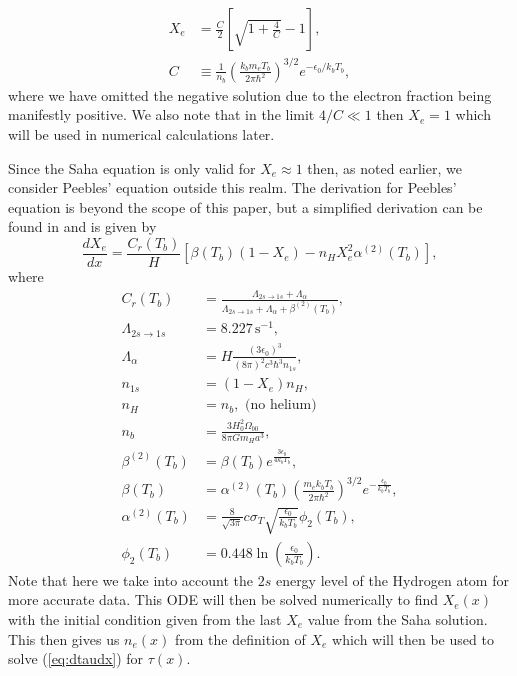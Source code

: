 \documentclass[%
reprint,
 amsmath,amssymb,
 aps,
]{revtex4-2}
\begin{document}
\begin{align}
	X_e&=\frac{C}{2}\left[\sqrt{1+\frac{4}{C}}-1 \right],\label{eq:Saha}\\ 
	C&\equiv\frac{1}{n_b}\left(\frac{k_bm_eT_b}{2\pi\hbar^2}\right)^{3/2}e^{-\epsilon_0/k_bT_b},\label{eq:C}
\end{align}
where we have omitted the negative solution due to the electron fraction being manifestly positive. We also note that in the limit $4/C\ll1$ then $X_e=1$ which will be used in numerical calculations later.

Since the Saha equation is only valid for $X_e\approx1$ then, as noted earlier, we consider Peebles' equation outside this realm. The derivation for Peebles' equation is beyond the scope of this paper, but a simplified derivation can be found in \cite{Dodelson:2003ft} and is given by
\begin{equation}
	\frac{dX_e}{dx}=\frac{C_r(T_b)}{H}\left[\beta(T_b)(1-X_e)-n_HX_e^2\alpha^{(2)}(T_b)\right],\label{eq:Peebles}
\end{equation}
where
\begin{align*}
	C_r(T_b)&= \frac{\Lambda_{2s\rightarrow1s} +\Lambda_{\alpha}}{\Lambda_{2s\rightarrow1s} + \Lambda_{\alpha} +\beta^{(2)}(T_b)}, \\
	\Lambda_{2s\rightarrow1s}&= 8.227\,\text{s}^{-1},\\
	\Lambda_{\alpha}&= H\frac{(3\epsilon_0)^3}{(8\pi)^2 c^3\hbar^3 n_{1s}}, \\
	n_{1s}&= (1-X_e)n_H,\\
	n_H &= n_b, \,\,\text{(no helium)}\\
	n_b &= \frac{3H_0^2 \Omega_{b0}}{8\pi G m_H a^3},\\
	\beta^{(2)}(T_b) &= \beta(T_b) e^{\frac{3\epsilon_0}{4k_bT_b}},\\
	\beta(T_b) &= \alpha^{(2)}(T_b) \left(\frac{m_ek_bT_b}{2\pi \hbar^2}\right)^{3/2} e^{-\frac{\epsilon_0}{k_bT_b}},\\
	\alpha^{(2)}(T_b)&= \frac{8}{\sqrt{3\pi}}	c\sigma_T\sqrt{\frac{\epsilon_0}{k_bT_b}}\phi_2(T_b),\\
	\phi_2(T_b)&= 0.448\ln\left(\frac{\epsilon_0}{k_bT_b}\right).
\end{align*}
Note that here we take into account the $2s$ energy level of the Hydrogen atom for more accurate data. This ODE will then be solved numerically to find $X_e(x)$ with the initial condition given from the last $X_e$ value from the Saha solution. This then gives us $n_e(x)$ from the definition of $X_e$ which will then be used to solve (\ref{eq:dtaudx}) for $\tau(x)$.
\end{document}
